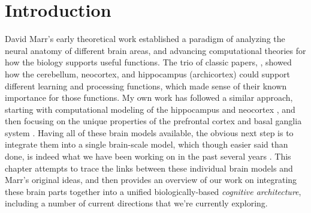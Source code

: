 \documentclass[11pt,twoside]{article}
\newif\myifpdf
\begin{document}
\titlesepage{\mytitle}{\myauthor}{\mynote}{\myabstract}





\pagestyle{myheadings}

\section{Introduction}

David Marr's early theoretical work established a paradigm of analyzing the neural anatomy of different brain areas, and advancing computational theories for how the biology supports useful functions.  The trio of classic papers, , showed how the cerebellum, neocortex, and hippocampus (archicortex) could support different learning and processing functions, which made sense of their known importance for those functions.  My own work has followed a similar approach, starting with computational modeling of the hippocampus and neocortex \cite{OReillyMcClelland94,McClellandMcNaughtonOReilly95,OReilly96,OReilly98}, and then focusing on the unique properties of the prefrontal cortex and basal ganglia system \cite{OReillyBraverCohen99,FrankLoughryOReilly01,OReillyFrank06,OReilly06}.  Having all of these brain models available, the obvious next step is to integrate them into a single brain-scale model, which though easier said than done, is indeed what we have been working on in the past several years \cite{OReillyHazyHerd15,HerdKruegerKrieteEtAl13,ZieglerChelianBenvenutoEtAl14}.  This chapter attempts to trace the links between these individual brain models and Marr's original ideas, and then provides an overview of our work on integrating these brain parts together into a unified biologically-based {\em cognitive architecture}, including a number of current directions that we're currently exploring.
\end{document}
